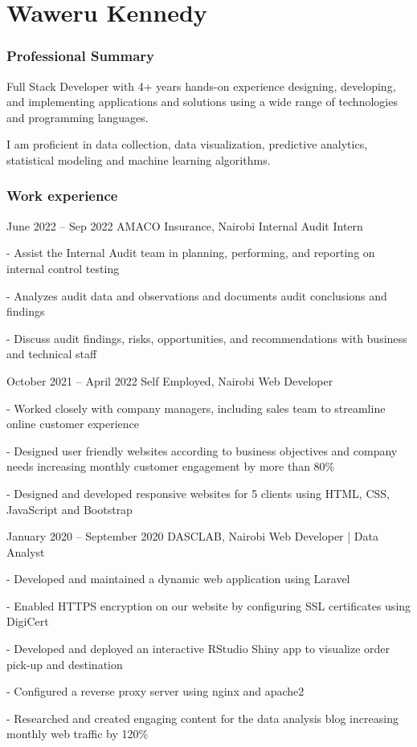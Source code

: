 \documentclass[fontsize=9pt]{tccv}
\begin{document}
\part{Waweru Kennedy}

\section{Professional Summary}

Full Stack Developer with 4+ years hands-on experience designing, developing, and implementing applications and solutions using a wide range of technologies and programming languages.

I am proficient in data collection, data visualization, predictive analytics, statistical modeling and
machine learning algorithms.

 
\section{Work experience}

\begin{eventlist}

\item{June 2022 -- Sep 2022}
     {AMACO Insurance, Nairobi}
     {Internal Audit Intern}

- Assist the Internal Audit team in planning, performing, and reporting on internal control testing

- Analyzes audit data and observations and documents audit conclusions and findings

- Discuss audit findings, risks, opportunities, and recommendations with business and technical staff


\item{October 2021 -- April 2022}
     {Self Employed, Nairobi}
     {Web Developer}

- Worked closely with company managers, including sales team to streamline online customer experience

- Designed user friendly websites according to business objectives and company needs increasing monthly customer engagement by more than 80\%

- Designed and developed responsive websites for 5 clients using HTML, CSS, JavaScript and Bootstrap

\item{January 2020 -- September 2020}
     {DASCLAB, Nairobi}
     {Web Developer | Data Analyst}
     
- Developed and maintained a dynamic web application using Laravel 

- Enabled HTTPS encryption on our website by configuring SSL certificates using DigiCert

- Developed and deployed an interactive RStudio Shiny app to visualize order pick-up and destination

- Configured a reverse proxy server using nginx and apache2

- Researched and created engaging content for the data analysis blog increasing monthly web traffic by 120\%

\end{eventlist}
\end{document}
